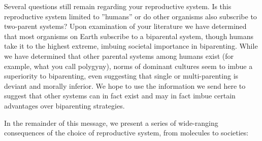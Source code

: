 
Several questions still remain regarding your reproductive system. Is this reproductive system limited to ''humans'' or do other organisms also subscribe to two-parent systems? Upon examination of your literature we have determined that most organisms on Earth subscribe to a biparental system, though humans take it to the highest extreme, imbuing societal importance in biparenting. While we have determined that other parental systems among humans exist (for example, what you call polygyny), norms of dominant cultures seem to imbue a superiority to biparenting, even suggesting that single or multi-parenting is deviant and morally inferior. We hope to use the information we send here to suggest that other systems can in fact exist and may in fact imbue certain advantages over biparenting strategies.

In the remainder of this message, we present a series of wide-ranging consequences of the choice of reproductive system, from molecules to societies:


